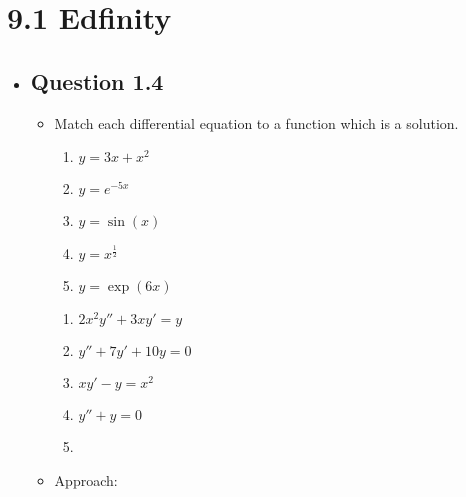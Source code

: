 \section{9.1 Edfinity}
\begin{itemize}
  \item[]

  \subsection{Question 1.4}
  \begin{itemize}
    \item Match each differential equation to a function which is a solution.
    \begin{multicols}{2}
      \begin{enumerate}[label=\Alph*.]
        \item \( y = 3x + x^2 \)
        \item \( y = e^{-5x} \)
        \item \( y = \sin(x) \)
        \item \( y = x^{\frac{1}{2}} \)
        \item \( y = \exp(6x) \)
      \end{enumerate}
      \begin{enumerate}
        \item \( 2x^2y'' + 3xy' = y \)
        \item  \( y'' + 7y' + 10y = 0 \)
        \item \( xy' - y = x^2 \)
        \item \( y'' + y = 0 \)
        \item []
      \end{enumerate}
    \end{multicols}

  \item Approach:

  \end{itemize}
\end{itemize}
